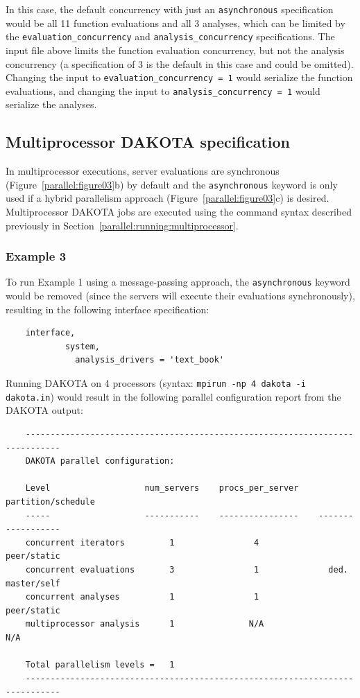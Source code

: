 In this case, the default concurrency with just an
\texttt{asynchronous} specification would be all 11 function
evaluations and all 3 analyses, which can be limited by the
\texttt{evaluation\_concurrency} and \texttt{analysis\_concurrency}
specifications. The input file above limits the function evaluation
concurrency, but not the analysis concurrency (a specification of 3 is
the default in this case and could be omitted). Changing the input to
\texttt{evaluation\_concurrency = 1} would serialize the function
evaluations, and changing the input to \texttt{analysis\_concurrency = 1}
would serialize the analyses.

\subsection{Multiprocessor DAKOTA specification}\label{parallel:spec:multi}

In multiprocessor executions, server evaluations are synchronous
(Figure~\ref{parallel:figure03}b) by default and the
\texttt{asynchronous} keyword is only used if a hybrid parallelism
approach (Figure~\ref{parallel:figure03}c) is desired. Multiprocessor
DAKOTA jobs are executed using the command syntax described previously
in Section~\ref{parallel:running:multiprocessor}.

\subsubsection{Example 3}\label{parallel:spec:multi:example3}

To run Example 1 using a message-passing approach, the
\texttt{asynchronous} keyword would be removed (since the servers will
execute their evaluations synchronously), resulting in the following
interface specification:
\begin{small}
\begin{verbatim}
    interface,
            system,
              analysis_drivers = 'text_book'
\end{verbatim}
\end{small}

Running DAKOTA on 4 processors (syntax: \texttt{mpirun -np 4 dakota -i
  dakota.in}) would result in the following parallel configuration
report from the DAKOTA output:
\begin{small}
\begin{verbatim}
    -----------------------------------------------------------------------------
    DAKOTA parallel configuration:

    Level                   num_servers    procs_per_server    partition/schedule
    -----                   -----------    ----------------    ------------------
    concurrent iterators         1                4              peer/static
    concurrent evaluations       3                1              ded. master/self
    concurrent analyses          1                1              peer/static
    multiprocessor analysis      1               N/A                N/A

    Total parallelism levels =   1
    -----------------------------------------------------------------------------
\end{verbatim}
\end{small}


